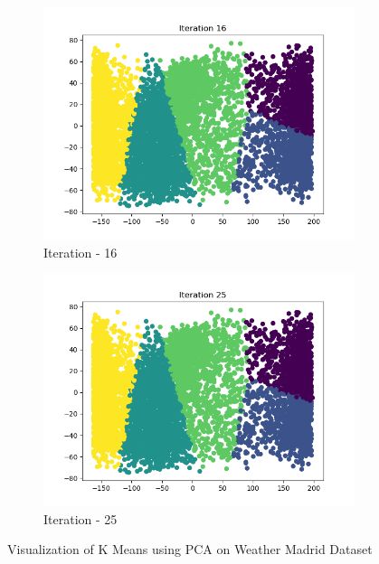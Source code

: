 \documentclass[12pt]{article}
\begin{document}
\begin{figure}[H]
\begin{subfigure}{0.45\linewidth}
	\includegraphics[scale=0.45]{km/16.png}
	\caption{Iteration - 16}
\end{subfigure}%
	\begin{subfigure}{0.45\linewidth}
	\includegraphics[scale=0.45]{km/25.png}
	\caption{Iteration - 25}
\end{subfigure}%
	\caption{Visualization of K Means using PCA on Weather Madrid Dataset}
\end{figure}
\end{document}
